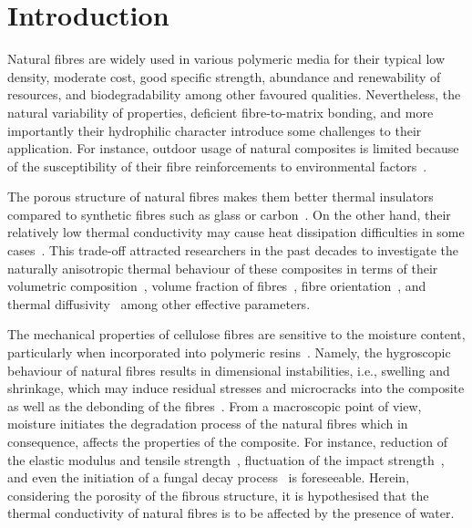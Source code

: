 \section{Introduction}
	Natural fibres are widely used in various polymeric media for their typical low density, moderate cost, good specific strength, abundance and renewability of resources, and biodegradability among other favoured qualities. Nevertheless, the natural variability of properties, deficient fibre-to-matrix bonding, and more importantly their hydrophilic character introduce some challenges to their application. For instance, outdoor usage of natural composites is limited because of the susceptibility of their fibre reinforcements to environmental factors~\autocite{Assarar.2011,Placet.2009}.

	The porous structure of natural fibres makes them better thermal insulators compared to synthetic fibres such as glass or carbon~\autocite{Liu.2012}. On the other hand, their relatively low thermal conductivity may cause heat dissipation difficulties in some cases~\autocite{Kalaprasad.2000}. This trade-off attracted researchers in the past decades to investigate the naturally anisotropic thermal behaviour of these composites in terms of their volumetric composition~\autocite{Shah.2016}, volume fraction of fibres~\autocite{Li.2008}, fibre orientation~\autocite{Behzad.2007}, and thermal diffusivity~\autocite{Mangal.2003,Kalaprasad.2000} among other effective parameters.

	The mechanical properties of cellulose fibres are sensitive to the moisture content, particularly when incorporated into polymeric resins~\autocite{Faruk.2012}. Namely, the hygroscopic behaviour of natural fibres results in dimensional instabilities, i.e., swelling and shrinkage, which may induce residual stresses and microcracks into the composite as well as the debonding of the fibres~\autocite{Rakovsky.2014,Celino.2014}. From a macroscopic point of view, moisture initiates the degradation process of the natural fibres which in consequence, affects the properties of the composite. For instance, reduction of the elastic modulus and tensile strength~\autocite{Chow.2007,DHAKAL.2007}, fluctuation of the impact strength~\autocite{Athijayamani.2009}, and even the initiation of a fungal decay process~\autocite{Schirp.2007} is foreseeable. Herein, considering the porosity of the fibrous structure, it is hypothesised that the thermal conductivity of natural fibres is to be affected by the presence of water.
	
